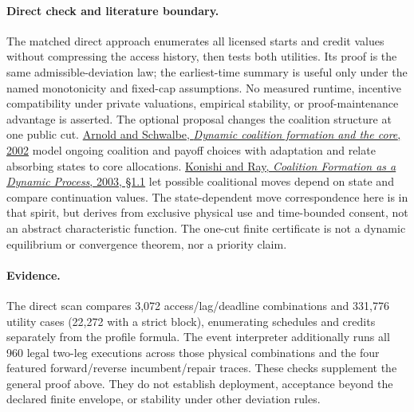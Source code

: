 \documentclass[11pt]{article}
\begin{document}
\paragraph{Direct check and literature boundary.}
The matched direct approach enumerates all licensed starts and credit values without compressing the access history, then tests both utilities. Its proof is the same admissible-deviation law; the earliest-time summary is useful only under the named monotonicity and fixed-cap assumptions. No measured runtime, incentive compatibility under private valuations, empirical stability, or proof-maintenance advantage is asserted. The optional proposal changes the coalition structure at one public cut. \href{https://www.sciencedirect.com/science/article/pii/S016726810200015X}{Arnold and Schwalbe, \emph{Dynamic coalition formation and the core}, 2002} model ongoing coalition and payoff choices with adaptation and relate absorbing states to core allocations. \href{https://pages.nyu.edu/debraj/Papers/KonishiRay.pdf}{Konishi and Ray, \emph{Coalition Formation as a Dynamic Process}, 2003, \S1.1} let possible coalitional moves depend on state and compare continuation values. The state-dependent move correspondence here is in that spirit, but derives from exclusive physical use and time-bounded consent, not an abstract characteristic function. The one-cut finite certificate is not a dynamic equilibrium or convergence theorem, nor a priority claim.

\paragraph{Evidence.}
The direct scan compares 3,072 access/lag/deadline combinations and 331,776 utility cases (22,272 with a strict block), enumerating schedules and credits separately from the profile formula. The event interpreter additionally runs all 960 legal two-leg executions across those physical combinations and the four featured forward/reverse incumbent/repair traces. These checks supplement the general proof above. They do not establish deployment, acceptance beyond the declared finite envelope, or stability under other deviation rules.
\end{document}
